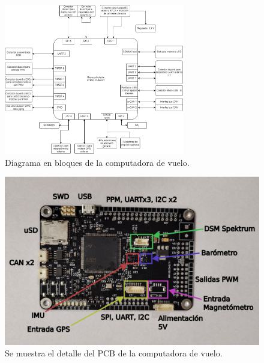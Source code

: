 \begin{figure}[htb]
    \centering
    \includegraphics[width=0.7\textwidth]{img/diagrama_en_bloques_computadora_de_vuelo.png}
    \caption{Diagrama en bloques de la computadora de vuelo.}
    \label{fig:diagrama_en_bloques_computadora_de_vuelo}
\end{figure}

\begin{figure}[htb]
    \centering
    \includegraphics[width=\textwidth]{img/chori_detalle.png}
    \caption{Se muestra el detalle del PCB de la computadora de vuelo.}
    \label{fig:chori_detalle}    
\end{figure}

